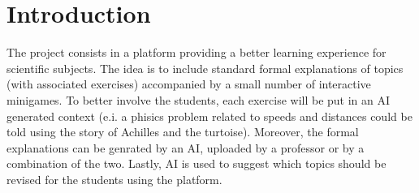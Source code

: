 \section{Introduction} \label{introduction}
The project consists in a platform providing a better learning experience for scientific subjects. The idea is to include standard formal explanations of topics (with associated exercises) accompanied by a small number of interactive minigames. To better involve the students, each exercise will be put in an AI generated context (e.i. a phisics problem related to speeds and distances could be told using the story of Achilles and the turtoise). Moreover, the formal explanations can be genrated by an AI, uploaded by a professor or by a combination of the two. Lastly, AI is used to suggest which topics should be revised for the students using the platform.
